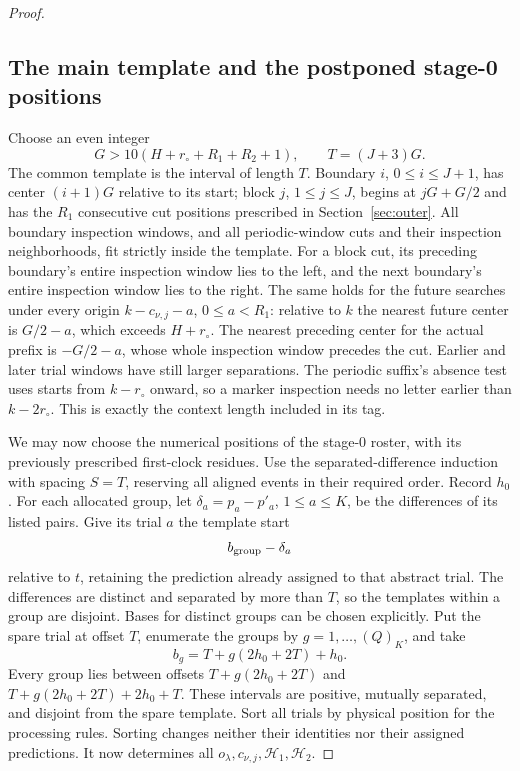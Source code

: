 \begin{proof}
\subsection*{The main template and the postponed stage-0 positions}
Choose an even integer
\[
 G>10(H+r_\circ+R_1+R_2+1),
 \qquad T=(J+3)G.
\]
The common template is the interval of length \(T\).  Boundary
\(i\), \(0\le i\le J+1\), has center \((i+1)G\) relative to its
start; block \(j\), \(1\le j\le J\), begins at
\(jG+G/2\) and has the \(R_1\) consecutive cut positions prescribed
in Section~\ref{sec:outer}.  All boundary inspection windows, and
all periodic-window cuts and their inspection neighborhoods, fit
strictly inside the template.  For a block cut, its preceding
boundary's entire inspection window lies to the left, and the next
boundary's entire inspection window lies to the right.
The same holds for the future searches under every origin
\(k-c_{\nu,j}-a\), \(0\le a<R_1\): relative to \(k\) the nearest
future center is \(G/2-a\), which exceeds \(H+r_\circ\).
The nearest preceding center for the actual prefix is
\(-G/2-a\), whose whole inspection window precedes the cut.
Earlier and later trial windows have still larger separations.
The periodic suffix's absence test uses starts from
\(k-r_\circ\) onward, so a marker inspection needs no letter earlier
than \(k-2r_\circ\).  This is exactly the context length included
in its tag.

We may now choose the numerical positions of the stage-0 roster,
with its previously prescribed first-clock residues.  Use the
separated-difference induction with spacing \(S=T\), reserving all
aligned events in their required order.  Record \(h_0\).
For each allocated group, let
\(\delta_a=p_a-p'_a\), \(1\le a\le K\), be the differences of its
listed pairs.  Give its trial \(a\) the template start
\begin{equation}\label{eq:parameter-translated-template}
 b_{\rm group}-\delta_a
\end{equation}
relative to \(t\), retaining the prediction already assigned to
that abstract trial.  The differences are distinct and separated by
more than \(T\), so the templates within a group are disjoint.
Bases for distinct groups can be chosen explicitly.  Put the spare
trial at offset \(T\), enumerate the groups by \(g=1,\ldots,(Q)_K\),
and take
\[
 b_g=T+g(2h_0+2T)+h_0.
\]
Every group lies between offsets
\(T+g(2h_0+2T)\) and
\(T+g(2h_0+2T)+2h_0+T\).  These intervals are positive, mutually
separated, and disjoint from the spare template.  Sort all trials by
physical position for the processing rules.  Sorting changes neither
their identities nor their assigned predictions.  It now determines
all \(o_\lambda,c_{\nu,j},\mathcal H_1,\mathcal H_2\).


\end{proof}

